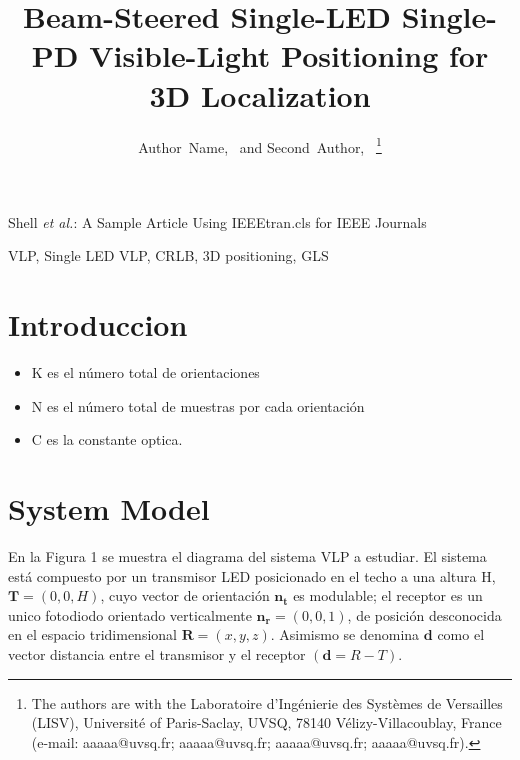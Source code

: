 \documentclass[lettersize,journal]{IEEEtran}
\begin{document}
\title{Beam-Steered Single-LED Single-PD Visible-Light Positioning for 3D Localization}
\author{Author~Name,~ and Second~Author,~%
\thanks{ The authors are with the Laboratoire d’Ingénierie des Systèmes de Versailles (LISV), Université of Paris-Saclay, UVSQ, 78140
 Vélizy-Villacoublay, France (e-mail: aaaaa@uvsq.fr; aaaaa@uvsq.fr; aaaaa@uvsq.fr; aaaaa@uvsq.fr).}
}
%
{Shell \MakeLowercase{\textit{et al.}}: A Sample Article Using IEEEtran.cls for IEEE Journals}
\maketitle

\begin{abstract}
\end{abstract}

\begin{IEEEkeywords}
    VLP, Single LED VLP, CRLB, 3D positioning, GLS
\end{IEEEkeywords}

\section{Introduccion}
\begin{itemize}
    \item K es el número total de orientaciones
    \item N es el número total de muestras por cada orientación
    \item C es la constante optica.
\end{itemize}



\section{System Model}
\label{sec:System Model}
En la Figura 1 se muestra el diagrama del sistema VLP a estudiar. El sistema está compuesto por un transmisor LED posicionado en el techo a una altura H, $\mathbf{T}=(0,0,H)$, cuyo vector de orientación $\mathbf{n_t}$ es modulable; el receptor es un unico fotodiodo orientado verticalmente $\mathbf{n_r}=(0,0,1)$, de posición desconocida en el espacio tridimensional $\mathbf{R}=(x,y,z)$. Asimismo se denomina $\mathbf{d}$ como el vector distancia entre el transmisor y el receptor $(\mathbf{d} = R - T)$.
\end{document}
